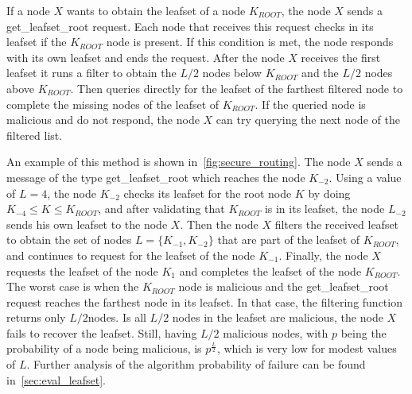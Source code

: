 If a node $X$ wants to obtain the leafset of a node $K_{ROOT}$, the node $X$ sends a get\_leafset\_root request.
Each node that receives this request checks in its leafset if the $K_{ROOT}$
node is present. If this condition is met, the node responds with its own
leafset and ends the request.
After the node $X$ receives the first leafset it runs a filter to obtain the
$L/2$ nodes  below $K_{ROOT}$ and the $L/2$ nodes above $K_{ROOT}$. Then
queries directly for the leafset of the farthest filtered node to complete
the missing nodes of the leafset of $K_{ROOT}$.  If the queried node is
malicious and do not respond,  the node $X$ can try querying the next node of
the filtered list.

An example of this method is shown in~\ref{fig:secure_routing}. The node $X$
sends a message of the type get\_leafset\_root which reaches the node $K_{-2}$.
Using a value of $L = 4$, the node $K_{-2}$ checks its leafset for the root
node $K$ by doing $K_{-4} \le K \le K_{ROOT}$, and after validating that $K_{ROOT}$
is in its leafset, the node $L_{-2}$ sends his own leafset to the node $X$.
Then the node $X$ filters the received leafset to obtain the set of nodes 
$L = \{K_{-1}, K_{-2}\}$ that are part of the leafset of $K_{ROOT}$,  and
continues to request for the leafset of the node $K_{-1}$. Finally, the node $X$
requests the leafset of the node $K_{1}$ and completes the leafset of the node
$K_{ROOT}$. The worst case is when the $K_{ROOT}$ node is malicious and the
get\_leafset\_root request reaches the farthest node in its leafset. In that
case, the filtering function returns only $L/2$nodes. Is all $L/2$ nodes in the
leafset are malicious, the node $X$ fails to recover the leafset. Still, having $L/2$
malicious nodes, with $p$ being the probability of a node being malicious, is
$p^{\frac{L}{2}}$, which is very low for modest values of $L$. Further
analysis of the algorithm probability of failure can be found in~\ref{sec:eval_leafset}.


